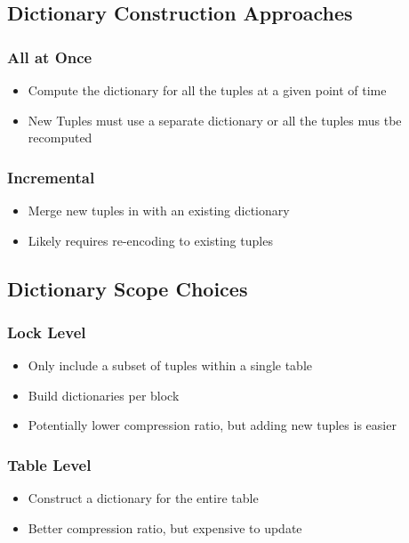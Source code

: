 \documentclass[11pt]{article}
\begin{document}
    \subsection*{Dictionary Construction Approaches}
        \subsubsection*{All at Once}
        \begin{itemize}
            \item Compute the dictionary for all the tuples at a given point of time
            \item New Tuples must use a separate dictionary or all the tuples mus tbe recomputed
        \end{itemize}
        \subsubsection*{Incremental}
        \begin{itemize}
            \item Merge new tuples in with an existing dictionary
            \item Likely requires re-encoding to existing tuples
        \end{itemize}

    \subsection*{Dictionary Scope Choices}
        \subsubsection*{Lock Level}
        \begin{itemize}
            \item Only include a subset of tuples within a single table
            \item Build dictionaries per block
            \item Potentially lower compression ratio, but adding new tuples is easier
        \end{itemize}

        \subsubsection*{Table Level}
        \begin{itemize}
            \item Construct a dictionary for the entire table
            \item Better compression ratio, but expensive to update
        \end{itemize}
\end{document}

